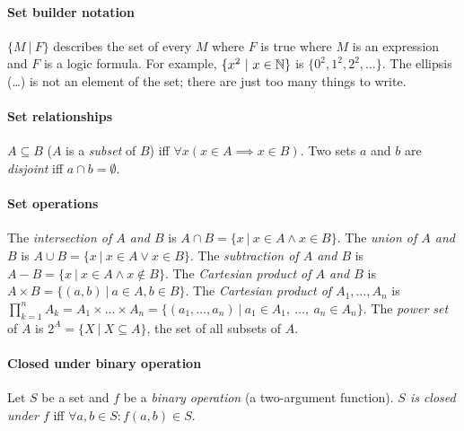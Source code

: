 %
%
\paragraph{Set builder notation}
\( \{ M ~|~ F \} \)
describes the set of every \(M\) where \(F\) is true
where \(M\) is an expression and \(F\) is a logic formula.
For example, \(\{ x^2 ~|~ x \in \mathbb{N} \}\) is \(\{ 0^2, 1^2, 2^2, \ldots \}\).
The ellipsis (\ldots) is not an element of the set;
there are just too many things to write.

\paragraph{Set relationships}
%
\(A \subseteq B\)
(\(A\) is a \emph{subset} of \(B\))
iff \(\forall x (x \in A \implies x \in B)\).
%
%
Two sets \(a\) and \(b\) are \emph{disjoint} iff \(a \cap b = \emptyset\).

\paragraph{Set operations}
%
%
The \emph{intersection of \(A\) and \(B\)} is
\(A \cap B = \{ x ~|~ x \in A \wedge x \in B \}\).
%
%
The \emph{union of \(A\) and \(B\)} is
\(A \cup B = \{ x ~|~ x \in A \vee x \in B \}\).
%
%
The \emph{subtraction of \(A\) and \(B\)} is
\(A - B = \{ x ~|~ x \in A \wedge x \not\in B \}\).
%
The \emph{Cartesian product of \(A\) and \(B\)} is \(A \times B = \{ (a,b) ~|~ a \in A, b \in B \}\).
The \emph{Cartesian product of \(A_1,\ldots,A_n\)} is
\(\prod_{k=1}^n A_k = A_1 \times \ldots \times A_n = \{ (a_1,\ldots,a_n) ~|~ a_1 \in A_1, ~\ldots, ~a_n \in A_n \}\).
%
%
The \emph{power set} of \(A\) is \(2^A = \{ X ~|~ X \subseteq A \}\),
the set of all subsets of \(A\).

\paragraph{Closed under binary operation}
%
Let \(S\) be a set and \(f\) be a \emph{binary operation} (a two-argument function).
\emph{\(S\) is closed under \(f\)} iff
\(\forall a, b \in S : f(a,b) \in S\).

